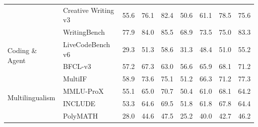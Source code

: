 \begin{table}[t]
\begin{tabular}{lllllllll}
                                 & Creative   Writing v3            & 55.6                 & 76.1                 & 82.4                 & 50.6                & 61.1              & 78.5              & 75.6                   \\
                                 & WritingBench                     & 77.9                 & 84.0                 & 85.5                 & 68.9                & 73.5              & 75.0              & 83.3                   \\
\midrule
\multirow{2}{*}{Coding   \& Agent} & LiveCodeBench v6 & 29.3                 & 51.3                 & 58.6                 & 31.3                & 48.4              & 51.0              & 55.2                   \\
                                 & BFCL-v3                          & 57.2                 & 67.3                 & 63.0                 & 56.6                & 65.9              & 68.1              & 71.2                   \\
\midrule
\multirow{4}{*}{Multilingualism} & MultiIF                          & 58.9                 & 73.6                 & 75.1                 & 51.2                & 66.3              & 71.2              & 77.3                   \\
                                 & MMLU-ProX                        & 55.1                 & 65.0                 & 70.7                 & 50.4                & 61.0              & 68.1              & 64.2                   \\
                                 & INCLUDE                          & 53.3                 & 64.6                 & 69.5                 & 51.8                & 61.8              & 67.8              & 64.4                   \\
                                 & PolyMATH                         & 28.0                 & 44.6                 & 47.5                 & 25.2                & 40.0              & 42.7              & 46.2    \\
\bottomrule
\end{tabular}
\label{tab: exp_qwen3_vl_2b_4b_8b_thinking}
\end{table}